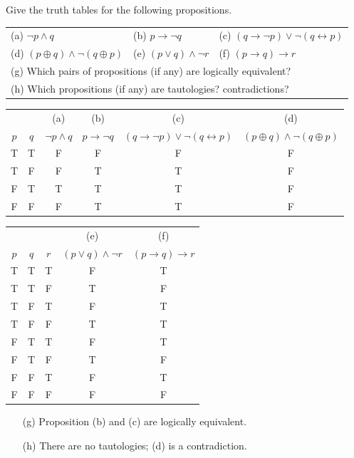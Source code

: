 \documentclass[12pt,addpoints]{exam}
\begin{document}
\begin{questions}
\question Give the truth tables for the following propositions. \\
 \begin{tabular}{lll}
    (a) $\neg p \wedge q$ & (b) $p \rightarrow \neg q$ & (c) $(q \rightarrow \neg p) \vee \neg (q \leftrightarrow p)$ \\
    (d) $(p \oplus q) \wedge \neg (q \oplus p)$ & (e) $(p \vee q) \wedge \neg r$ & (f) $(p \rightarrow q) \rightarrow r$ \\
    \multicolumn{3}{l}{(g) Which pairs of propositions (if any) are logically equivalent?} \\
    \multicolumn{3}{l}{(h) Which propositions (if any) are tautologies? contradictions?} \\
 \end{tabular}
 \begin{solution}
 \small
        \begin{tabular}{|cc|c|c|c|c|}
    \hline
         & & (a) & (b) & (c) & (d)  \\
        $p$ & $q$ & $\neg p \wedge q$  & $p \rightarrow \neg q$
        & $(q \rightarrow \neg p) \vee \neg (q \leftrightarrow p)$ & $(p \oplus q) \wedge \neg (q \oplus p)$ \\
    \hline
        T & T & F & F & F & F \\
        T & F & F & T & T & F \\
        F & T & T & T & T & F \\
        F & F & F & T & T & F \\
    \hline
    \end{tabular}

    \begin{tabular}{|ccc|c|c|}
    \hline
      & & & (e) & (f) \\
     $p$ & $q$ & $r$ & $(p \vee q) \wedge \neg r$ & $(p \rightarrow q) \rightarrow r$ \\
     \hline
     T & T & T & F & T \\
     T & T & F & T & F \\
     T & F & T & F & T \\
     T & F & F & T & T \\
     F & T & T & F & T \\
     F & T & F & T & F \\
     F & F & T & F & T \\
     F & F & F & F & F \\
    \hline
    \end{tabular}
    \begin{itemize}
        \item[(g)] Proposition (b) and (c) are logically equivalent.
        \item[(h)] There are no tautologies; (d) is a contradiction.
    \end{itemize}
   \end{solution}



\end{questions}
\end{document}
